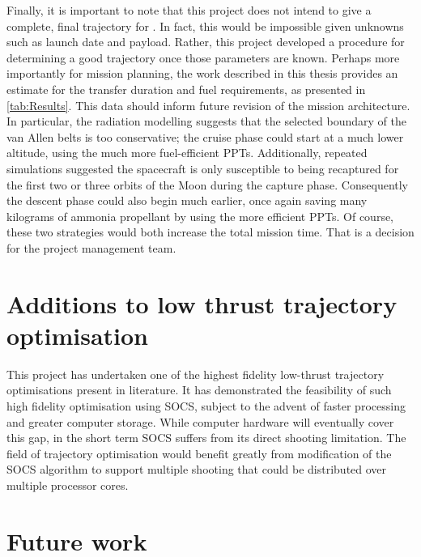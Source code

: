 Finally, it is important to note that this project does not intend to give a complete, final trajectory for \BW. In fact, this would be impossible given unknowns such as launch date and payload. Rather, this project developed a procedure for determining a good trajectory once those parameters are known. Perhaps more importantly for mission planning, the work described in this thesis provides an estimate for the transfer duration and fuel requirements, as presented in \autoref{tab:Results}. This data should inform future revision of the mission architecture. In particular, the radiation modelling suggests that the selected boundary of the van Allen belts is too conservative; the cruise phase could start at a much lower altitude, using the much more fuel-efficient PPTs. Additionally, repeated simulations suggested the spacecraft is only susceptible to being recaptured for the first two or three orbits of the Moon during the capture phase. Consequently the descent phase could also begin much earlier, once again saving many kilograms of ammonia propellant by using the more efficient PPTs. Of course, these two strategies would both increase the total mission time. That is a decision for the project management team.







\section{Additions to low thrust trajectory optimisation} \label{sec:Optimisation-additions}

This project has undertaken one of the highest fidelity low-thrust trajectory optimisations present in literature. It has  demonstrated the feasibility of such high fidelity optimisation using SOCS, subject to the advent of faster processing and greater computer storage. While computer hardware will eventually cover this gap, in the short term SOCS suffers from its direct shooting limitation. The field of trajectory optimisation would benefit greatly from modification of the SOCS algorithm to support multiple shooting that could be distributed over multiple processor cores.




\section{Future work} \label{sec:Future-work}

